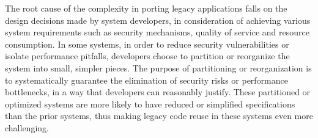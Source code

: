 The root cause of the complexity in porting legacy applications
falls on the design decisions made by system developers,
in consideration of achieving various system requirements
such as security mechanisms, quality of service and resource consumption.
In some systems, in order to reduce security vulnerabilities or isolate performance pitfalls,
developers choose to partition or reorganize the system into
small, simpler pieces.
The purpose of partitioning or reorganization is to systematically guarantee
the elimination of security risks or performance bottlenecks,
in a way that developers can reasonably justify. %
These partitioned or optimized systems are more likely to
have reduced or simplified specifications than the prior systems,
thus making legacy code reuse in these systems even more challenging.









